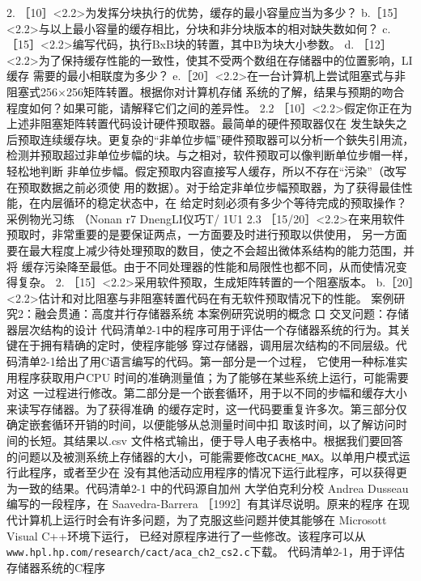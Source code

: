 2. ［10］<2.2>为发挥分块执行的优势，缓存的最小容量应当为多少？
b.［15］ <2.2>与以上最小容量的缓存相比，分块和非分块版本的相对缺失数如何？
c.［15］<2.2>编写代码，执行BxB块的转置，其中B为块大小参数。
d. ［12］<2.2>为了保持缓存性能的一致性，使其不受两个数组在存储器中的位置影响，LI缓存
需要的最小相联度为多少？
e.［20］<2.2>在一台计算机上尝试阻塞式与非阻塞式256×256矩阵转置。根据你对计算机存储
系统的了解，结果与预期的吻合程度如何？如果可能，请解释它们之间的差异性。
2.2
［10］<2.2>假定你正在为上述非阻塞矩阵转置代码设计硬件预取器。最简单的硬件预取器仅在
发生缺失之后预取连续缓存块。更复杂的“非单位步幅”硬件预取器可以分析一个鋏失引用流，
检测并预取超过非单位步幅的块。与之相对，软件预取可以像判断单位步帽一样，轻松地判断
非单位步幅。假定预取内容直接写人缓存，所以不存在“污染”（改写在预取数据之前必须使
用的数据）。对于给定非单位步幅预取器，为了获得最佳性能，在内层循环的稳定状态中，在
给定时刻必须有多少个等待完成的预取操作？
采例物光习练 （Nonan
r7 DnengLI仪巧T/
1U1
2.3
［15/20］<2.2>在来用软件预取时，非常重要的是要保证两点，一方面要及时进行预取以供使用，
另一方面要在最大程度上减少待处理预取的数目，使之不会超出微体系结构的能力范围，并将
缓存污染降至最低。由于不同处理器的性能和局限性也都不同，从而使情况变得复杂。
2. ［15］<2.2>采用软件预取，生成矩阵转置的一个阻塞版本。
b.［20］<2.2>估计和对比阻塞与非阻塞转置代码在有无软件预取情况下的性能。
案例研究2：融会贯通：高度并行存储器系统
本案例研究说明的概念
口 交叉问题：存储器层次结构的设计
代码清单2-1中的程序可用于评估一个存储器系统的行为。其关键在于拥有精确的定时，使程序能够
穿过存储器，调用层次结构的不同层级。代码清单2-1给出了用C语言编写的代码。第一部分是一个过程，
它使用一种标准实用程序获取用户CPU 时间的准确测量值；为了能够在某些系统上运行，可能需要对这
一过程进行修改。第二部分是一个嵌套循环，用于以不同的步幅和缓存大小来读写存储器。为了获得准确
的缓存定时，这一代码要重复许多次。第三部分仅确定嵌套循环开销的时间，以便能够从总测量时间中扣
取该时间，以了解访问时间的长短。其结果以.csv 文件格式输出，便于导人电子表格中。根据我们要回答
的问题以及被测系统上存储器的大小，可能需要修改\verb|CACHE_MAX|。以单用户模式运行此程序，或者至少在
没有其他活动应用程序的情况下运行此程序，可以获得更为一致的结果。代码清单2-1 中的代码源自加州
大学伯克利分校 Andrea Dusseau编写的一段程序，在 Saavedra-Barrera ［1992］有其详尽说明。原来的程序
在现代计算机上运行时会有许多问题，为了克服这些问题并使其能够在 Microsott Visual C++环境下运行，
已经对原程序进行了一些修改。该程序可以从 \verb|www.hpl.hp.com/research/cact/aca_ch2_cs2.c|下载。
代码清单2-1，用于评估存储器系统的C程序

